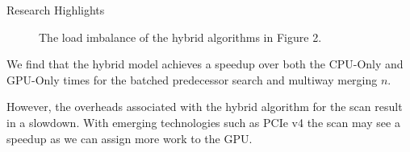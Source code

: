 \documentclass[final]{beamer}
\newlength{\colwidth}
\begin{document}
\begin{frame}[t]
\begin{columns}[t]
\begin{column}{\colwidth}
\begin{block}{Research Highlights}
\begin{figure}[t]
\centering
{}
    \caption{The load imbalance of the hybrid algorithms in Figure 2.}
   \label{fig:scan_results}
\end{figure}

\end{block} 
\begin{description}[font=$\bullet$~\normalfont\scshape\color{red!50!black}]
\item We find that the hybrid model achieves a speedup over both the CPU-Only and GPU-Only times for the batched predecessor search and multiway merging $n$. 
\item However, the overheads associated with the hybrid algorithm for the scan result in a slowdown. With emerging technologies such as PCIe v4 the scan may see
  a speedup as we can assign more work to the GPU.
\end{description}



\end{column}
\end{columns}
\end{frame}
\end{document}
